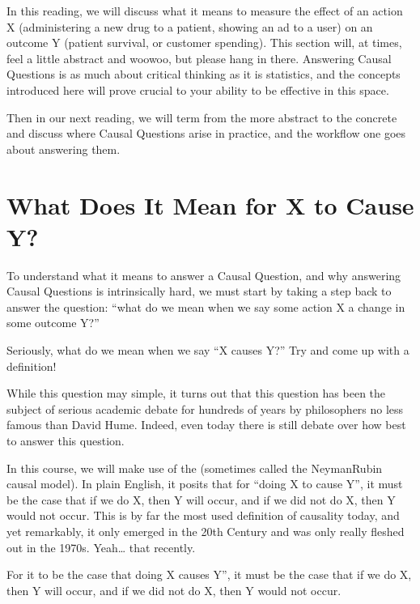 \documentclass[letterpaper,10pt,english]{jupyterBook}
\begin{document}
\sphinxAtStartPar
In this reading, we will discuss what it means to measure the effect of an action X (administering a new drug to a patient, showing an ad to a user) on an outcome Y (patient survival, or customer spending). This section will, at times, feel a little abstract and woo\sphinxhyphen{}woo, but please hang in there. Answering Causal Questions is as much about critical thinking as it is statistics, and the concepts introduced here will prove crucial to your ability to be effective in this space.

\sphinxAtStartPar
Then in our next reading, we will term from the more abstract to the concrete and discuss where Causal Questions arise in practice, and the workflow one goes about answering them.


\section{What Does It Mean for X to Cause Y?}
\label{\detokenize{30_questions/30_causal_questions_theory:what-does-it-mean-for-x-to-cause-y}}
\sphinxAtStartPar
To understand what it means to answer a Causal Question, and why answering Causal Questions is intrinsically hard, we must start by taking a step back to answer the question: “what do we mean when we say some action X  a change in some outcome Y?”

\sphinxAtStartPar
Seriously, what do we mean when we say “X causes Y?” Try and come up with a definition!

\sphinxAtStartPar
While this question may  simple, it turns out that this question has been the subject of serious academic debate for hundreds of years by philosophers no less famous than David Hume. Indeed, even today there is still debate over how best to answer this question.

\sphinxAtStartPar
In this course, we will make use of the  (sometimes called the Neyman\sphinxhyphen{}Rubin causal model). In plain English, it posits that for “doing X to cause Y”, it must be the case that if we do X, then Y will occur, and if we did not do X, then Y would not occur. This is by far the most used definition of causality today, and yet remarkably, it only emerged in the 20th Century and was only really fleshed out in the 1970s. Yeah… that recently.

\begin{sphinxShadowBox}

\sphinxAtStartPar
For it to be the case that doing X causes Y”, it must be the case that if we do X, then Y will occur, and if we did not do X, then Y would not occur.
\end{sphinxShadowBox}
\end{document}
